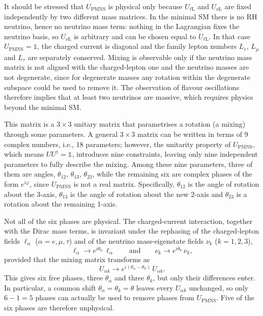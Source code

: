 It should be stressed that $U_\text{PMNS}$ is physical only because $U_{\ell\text{L}}$ and $U_{\nu\text{L}}$ are fixed independently by two different mass matrices. In the minimal \ac{SM} there is no \ac{RH} neutrino, hence no neutrino mass term: nothing in the Lagrangian fixes the neutrino basis, so $U_{\nu\text{L}}$ is arbitrary and can be chosen equal to $U_{\ell\text{L}}$. In that case $U_\text{PMNS} = \mathbb{1}$, the charged current is diagonal and the family lepton numbers $L_e$, $L_\mu$ and $L_\tau$ are separately conserved. Mixing is observable only if the neutrino mass matrix is not aligned with the charged-lepton one and the neutrino masses are not degenerate, since for degenerate masses any rotation within the degenerate subspace could be used to remove it. The observation of flavour oscillations therefore implies that at least two neutrinos are massive, which requires physics beyond the minimal \ac{SM}.

This matrix is a $3 \times 3$ unitary matrix that parametrises a rotation (a mixing) through some parameters. A general $3 \times 3$ matrix can be written in terms of 9 complex numbers, i.e., 18 parameters; however, the unitarity property of $U_{\text{PMNS}}$, which means $U U^\dagger = \mathbb{1}$, introduces nine constraints, leaving only nine independent parameters to fully describe the mixing. Among these nine parameters, three of them are angles, $\theta_{12}$, $\theta_{13}$, $\theta_{23}$, while the remaining six are complex phases of the form $e^{i \varphi}$, since $U_{\text{PMNS}}$ is not a real matrix. Specifically, $\theta_{12}$ is the angle of rotation about the 3-axis, $\theta_{13}$ is the angle of rotation about the new 2-axis and $\theta_{23}$ is a rotation about the remaining 1-axis.

Not all of the six phases are physical. The charged-current interaction, together with the Dirac mass terms, is invariant under the rephasing of the charged-lepton fields $\ell_\alpha$ ($\alpha = e, \mu, \tau$) and of the neutrino mass-eigenstate fields $\nu_k$ ($k = 1, 2, 3$),
\begin{equation}
    \ell_\alpha \longrightarrow e^{i\theta_\alpha}\,\ell_\alpha \qquad \text{and} \qquad \nu_k \longrightarrow e^{i\theta_k}\,\nu_k ,
\end{equation}
provided that the mixing matrix transforms as
\begin{equation}
    U_{\alpha k} \longrightarrow e^{i(\theta_\alpha - \theta_k)}\, U_{\alpha k}.
\end{equation}
This gives six free phases, three $\theta_\alpha$ and three $\theta_k$, but only their differences enter. In particular, a common shift $\theta_\alpha = \theta_k = \theta$ leaves every $U_{\alpha k}$ unchanged, so only $6 - 1 = 5$ phases can actually be used to remove phases from $U_\text{PMNS}$. Five of the six phases are therefore unphysical.

